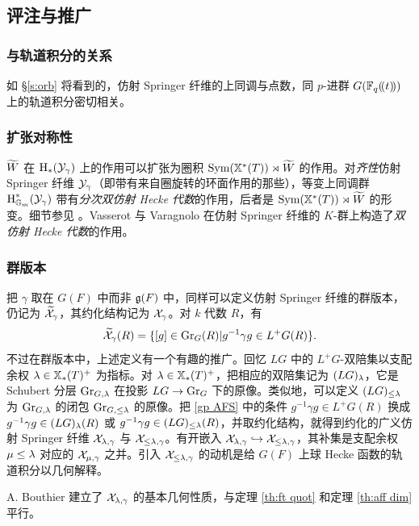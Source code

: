 \subsection{评注与推广}

\subsubsection{与轨道积分的关系} 如 \S\ref{s:orb} 将看到的，仿射 Springer 纤维的上同调与点数，同 $p$-进群 $G(\mathbb{F}_{q}(\!(t)\!))$ 上的轨道积分密切相关。

\subsubsection{扩张对称性} $\widetilde{W}$ 在 $\textup{H}_{*}({\mathcal{Y}_{\gamma}})$ 上的作用可以扩张为圈积 $\textup{Sym}(\mathbb{X}^*(T))\rtimes \widetilde{W}$ 的作用。对{\em 齐性}仿射 Springer 纤维 $\mathcal{Y}_{\gamma}$（即带有来自圈旋转的环面作用的那些），等变上同调群 $\textup{H}^{*}_{\mathbb{G}_m}(\mathcal{Y}_{\gamma})$ 带有{\em 分次双仿射 Hecke 代数}的作用，后者是 $\textup{Sym}(\mathbb{X}^*(T))\rtimes \widetilde{W}$ 的形变。细节参见 \cite{OY}。Vasserot 与 Varagnolo \cite{Vass} \cite{VV} 在仿射 Springer 纤维的 $K$-群上构造了{\em 双仿射 Hecke 代数}的作用。

\subsubsection{群版本} 把 $\gamma$ 取在 $G(F)$ 中而非 $\mathfrak{g}(F)$ 中，同样可以定义仿射 Springer 纤维的群版本，仍记为 $\widetilde{\mathcal{X}}_{\gamma}$，其约化结构记为 $\mathcal{X}_{\gamma}$。对 $k$ 代数 $R$，有
\begin{equation}\label{gp AFS}
\widetilde{\mathcal{X}}_{\gamma}(R)=\{[g]\in \textup{Gr}_{G}(R)|g^{-1}\gamma g\in L^{+}G(R)\}.
\end{equation}
不过在群版本中，上述定义有一个有趣的推广。回忆 $LG$ 中的 $L^{+}G$-双陪集以支配余权 $\lambda\in\mathbb{X}_*(T)^{+}$ 为指标。对 $\lambda\in\mathbb{X}_*(T)^{+}$，把相应的双陪集记为 $(LG)_{\lambda}$，它是 Schubert 分层 $\textup{Gr}_{G,\lambda}$ 在投影 $LG\to \textup{Gr}_{G}$ 下的原像。类似地，可以定义 $(LG)_{\leq \lambda}$ 为 $\textup{Gr}_{G,\lambda}$ 的闭包 $\textup{Gr}_{G,\leq \lambda}$ 的原像。把 \eqref{gp AFS} 中的条件 $g^{-1}\gamma g\in L^{+}G(R)$ 换成 $g^{-1}\gamma g\in (LG)_{\lambda}(R)$ 或 $g^{-1}\gamma g\in (LG)_{\leq\lambda}(R)$，并取约化结构，就得到约化的广义仿射 Springer 纤维 $\mathcal{X}_{\lambda,\gamma}$ 与 $\mathcal{X}_{\leq\lambda, \gamma}$。有开嵌入 $\mathcal{X}_{\lambda,\gamma}\hookrightarrow\mathcal{X}_{\leq\lambda,\gamma}$，其补集是支配余权 $\mu\leq\lambda$ 对应的 $\mathcal{X}_{\mu,\gamma}$ 之并。引入 $\mathcal{X}_{\leq\lambda,\gamma}$ 的动机是给 $G(F)$ 上球 Hecke 函数的轨道积分以几何解释。

A. Bouthier 建立了 $\mathcal{X}_{\lambda,\gamma}$ 的基本几何性质，与定理 \ref{th:ft quot} 和定理 \ref{th:aff dim} 平行。

